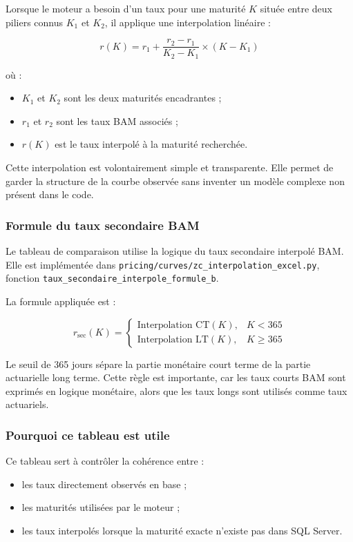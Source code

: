 \documentclass[12pt,a4paper]{article}
\begin{document}
Lorsque le moteur a besoin d'un taux pour une maturité $K$ située entre deux piliers connus $K_1$ et $K_2$, il applique une interpolation linéaire :

\[
r(K)
=
r_1
+
\frac{r_2-r_1}{K_2-K_1}
\times
(K-K_1)
\]

où :

\begin{itemize}
    \item $K_1$ et $K_2$ sont les deux maturités encadrantes ;
    \item $r_1$ et $r_2$ sont les taux BAM associés ;
    \item $r(K)$ est le taux interpolé à la maturité recherchée.
\end{itemize}

Cette interpolation est volontairement simple et transparente. Elle permet de garder la structure de la courbe observée sans inventer un modèle complexe non présent dans le code.

\subsubsection*{Formule du taux secondaire BAM}

Le tableau de comparaison utilise la logique du taux secondaire interpolé BAM. Elle est implémentée dans \texttt{pricing/curves/zc\_interpolation\_excel.py}, fonction \texttt{taux\_secondaire\_interpole\_formule\_b}.

La formule appliquée est :

\[
r_{\text{sec}}(K)
=
\begin{cases}
\text{Interpolation CT}(K), & K < 365 \\
\text{Interpolation LT}(K), & K \geq 365
\end{cases}
\]

Le seuil de 365 jours sépare la partie monétaire court terme de la partie actuarielle long terme. Cette règle est importante, car les taux courts BAM sont exprimés en logique monétaire, alors que les taux longs sont utilisés comme taux actuariels.

\subsubsection*{Pourquoi ce tableau est utile}

Ce tableau sert à contrôler la cohérence entre :

\begin{itemize}
    \item les taux directement observés en base ;
    \item les maturités utilisées par le moteur ;
    \item les taux interpolés lorsque la maturité exacte n'existe pas dans SQL Server.
\end{itemize}
\end{document}
